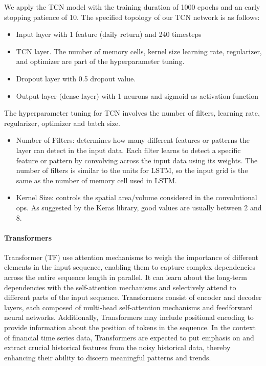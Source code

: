 \documentclass{article}
\begin{document}
We apply the TCN model with the training duration of 1000 epochs and an early stopping patience of 10. The specified topology of our TCN network is as follows:
\begin{itemize}
  \item Input layer with 1 feature (daily return) and 240 timesteps
  \item TCN layer. The number of memory cells, kernel size learning rate, regularizer, and optimizer are part of the hyperparameter tuning. 
  \item Dropout layer with 0.5 dropout value.
  \item Output layer (dense layer) with 1 neurons and sigmoid as activation function
\end{itemize}
The hyperparameter tuning for TCN involves the number of filters, learning rate, regularizer, optimizer and batch size. 
\begin{itemize}
  \item Number of Filters: determines how many different features or patterns the layer can detect in the input data. Each filter learns to detect a specific feature or pattern by convolving across the input data using its weights. The number of filters is similar to the units for LSTM, so the input grid is the same as the number of memory cell used in LSTM. 
  \item Kernel Size: controls the spatial area/volume considered in the convolutional ops. As suggested by the Keras library, good values are usually between 2 and 8. 
\end{itemize}

\paragraph{Transformers}
Transformer (TF) use attention mechanisms to weigh the importance of different elements in the input sequence, enabling them to capture complex dependencies across the entire sequence length in parallel. It can learn about the long-term dependencies with the self-attention mechanisms and selectively attend to different parts of the input sequence. Transformers consist of encoder and decoder layers, each composed of multi-head self-attention mechanisms and feedforward neural networks. Additionally, Transformers may include positional encoding to provide information about the position of tokens in the sequence. In the context of financial time series data, Transformers are expected to put emphasis on and extract crucial historical features from the noisy historical data, thereby enhancing their ability to discern meaningful patterns and trends.
\end{document}
